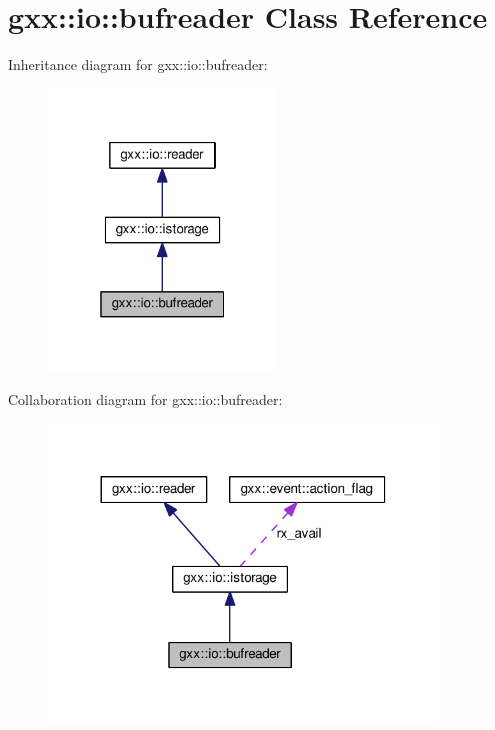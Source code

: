 \hypertarget{classgxx_1_1io_1_1bufreader}{}\section{gxx\+:\+:io\+:\+:bufreader Class Reference}
\label{classgxx_1_1io_1_1bufreader}


Inheritance diagram for gxx\+:\+:io\+:\+:bufreader\+:
\nopagebreak
\begin{figure}[H]
\begin{center}
\leavevmode
\includegraphics[width=172pt]{classgxx_1_1io_1_1bufreader__inherit__graph}
\end{center}
\end{figure}


Collaboration diagram for gxx\+:\+:io\+:\+:bufreader\+:
\nopagebreak
\begin{figure}[H]
\begin{center}
\leavevmode
\includegraphics[width=293pt]{classgxx_1_1io_1_1bufreader__coll__graph}
\end{center}
\end{figure}
